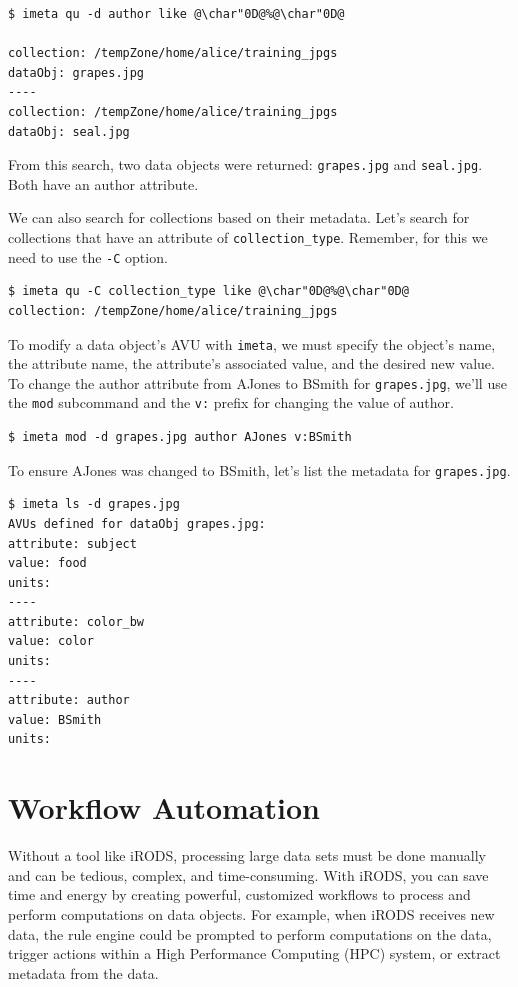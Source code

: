 \documentclass[10pt,oneside]{memoir}
\begin{document}
\begin{lstlisting}
$ imeta qu -d author like @\char"0D@%@\char"0D@

collection: /tempZone/home/alice/training_jpgs
dataObj: grapes.jpg
----
collection: /tempZone/home/alice/training_jpgs
dataObj: seal.jpg
\end{lstlisting}

From this search, two data objects were returned: \texttt{grapes.jpg} and \texttt{seal.jpg}. Both have an author attribute.

We can also search for collections based on their metadata. Let's search for collections that have an attribute of \texttt{collection\_type}. Remember, for this we need to use the \texttt{-C} option.

\begin{lstlisting}
$ imeta qu -C collection_type like @\char"0D@%@\char"0D@
collection: /tempZone/home/alice/training_jpgs
\end{lstlisting}

To modify a data object's AVU with \texttt{imeta}, we must specify the object's name, the attribute name, the attribute's associated value, and the desired new value. To change the author attribute from AJones to BSmith for \texttt{grapes.jpg}, we'll use the \texttt{mod} subcommand and the \texttt{v:} prefix for changing the value of author.

\begin{lstlisting}
$ imeta mod -d grapes.jpg author AJones v:BSmith
\end{lstlisting}

To ensure AJones was changed to BSmith, let's list the metadata for \texttt{grapes.jpg}.

\begin{lstlisting}
$ imeta ls -d grapes.jpg
AVUs defined for dataObj grapes.jpg:
attribute: subject
value: food
units:
----
attribute: color_bw
value: color
units:
----
attribute: author
value: BSmith
units:
\end{lstlisting}

\chapter{Workflow Automation}

Without a tool like iRODS, processing large data sets must be done manually and can be tedious, complex, and time-consuming. With iRODS, you can save time and energy by creating powerful, customized workflows to process and perform computations on data objects. For example, when iRODS receives new data, the rule engine could be prompted to perform computations on the data, trigger actions within a High Performance Computing (HPC) system, or extract metadata from the data.
\end{document}
